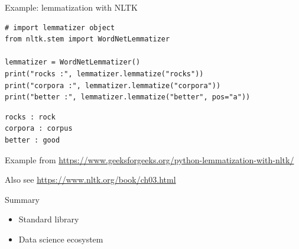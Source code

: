 \documentclass[aspectratio=169,usenames,dvipsnames]{beamer}
\begin{document}
\begin{frame}[fragile]{Example: lemmatization with NLTK}
\begin{lstlisting}
# import lemmatizer object
from nltk.stem import WordNetLemmatizer 
  
lemmatizer = WordNetLemmatizer() 
print("rocks :", lemmatizer.lemmatize("rocks")) 
print("corpora :", lemmatizer.lemmatize("corpora")) 
print("better :", lemmatizer.lemmatize("better", pos="a")) 
\end{lstlisting}
\pause\begin{lstlisting}[style=plain]
rocks : rock
corpora : corpus
better : good
\end{lstlisting}

{\small
Example from \url{https://www.geeksforgeeks.org/python-lemmatization-with-nltk/}

Also see \url{https://www.nltk.org/book/ch03.html}
}
\end{frame}


\begin{frame}{Summary}
    \begin{itemize}
        \item Standard library
        \item Data science ecosystem
    \end{itemize}
\end{frame}
\end{document}

